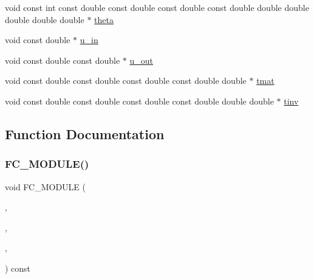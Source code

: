 \begin{DoxyCompactItemize}
void const int const double const double const double const double double double double double double $\ast$ \hyperlink{RoeKernels_8H_adb6f64e825dfbb4917994d2d1f934f17}{theta}
\item 
void const double $\ast$ \hyperlink{RoeKernels_8H_a2bf6aff605796b2e670cbe75c3e872e2}{u\+\_\+in}
\item 
void const double const double $\ast$ \hyperlink{RoeKernels_8H_aa81f1dc40301dafeb750cbf32d8d3833}{u\+\_\+out}
\item 
void const double const double const double const double double $\ast$ \hyperlink{RoeKernels_8H_ae5000afe2aef5d2927a3f3ec02cb4e2e}{tmat}
\item 
void const double const double const double const double double double $\ast$ \hyperlink{RoeKernels_8H_a9698f37ae98c96f7f647e1cf16a18ac3}{tinv}
\end{DoxyCompactItemize}


\subsection{Function Documentation}
\hypertarget{RoeKernels_8H_a52b10908b1958b2c6611bf1fb569b396}{}\label{RoeKernels_8H_a52b10908b1958b2c6611bf1fb569b396} 
\subsubsection{\texorpdfstring{F\+C\+\_\+\+M\+O\+D\+U\+L\+E()}{FC\_MODULE()}\hspace{0.1cm}{\footnotesize\ttfamily [1/5]}}
{\footnotesize\ttfamily void F\+C\+\_\+\+M\+O\+D\+U\+LE (\begin{DoxyParamCaption}\item[{roe}]{,  }\item[{pointroestate}]{,  }\item[{R\+OE}]{,  }\item[{P\+O\+I\+N\+T\+R\+O\+E\+S\+T\+A\+TE}]{ }\end{DoxyParamCaption}) const}

\hypertarget{RoeKernels_8H_a088a5f6038376dc46cbc26a51cc9fb21}{}\label{RoeKernels_8H_a088a5f6038376dc46cbc26a51cc9fb21} 
